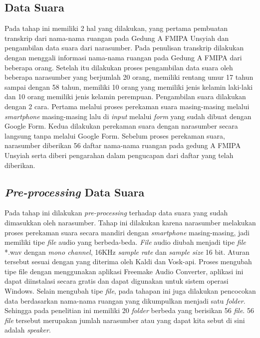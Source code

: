 \fancyhf{} 
\fancyfoot[R]{\thepage}

\subsection{Data Suara}
Pada tahap ini memiliki 2 hal yang dilakukan, yang pertama pembuatan transkrip dari nama-nama ruangan pada Gedung A FMIPA Unsyiah dan pengambilan data suara dari narasumber. Pada penulisan transkrip dilakukan dengan menggali informasi nama-nama ruangan pada Gedung A FMIPA dari beberapa orang. Setelah itu dilakukan proses pengambilan data suara oleh beberapa narasumber yang berjumlah 20 orang, memiliki rentang umur 17 tahun sampai dengan 58 tahun, memiliki 10 orang yang memiliki jenis kelamin laki-laki dan 10 orang memiliki jenis kelamin perempuan. Pengambilan suara dilakukan dengan 2 cara. Pertama melalui proses perekaman suara masing-masing melalui \textit{smartphone} masing-masing lalu di \textit{input} melalui \textit{form} yang sudah dibuat dengan Google Form. Kedua dilakukan perekaman suara dengan narasumber secara langsung tanpa melalui Google Form. Sebelum proses perekaman suara, narasumber diberikan 56 daftar nama-nama ruangan pada gedung A FMIPA Unsyiah serta diberi pengarahan dalam pengucapan dari daftar yang telah diberikan.

\subsection{\textit{Pre-processing} Data Suara}
Pada tahap ini dilakukan \textit{pre-processing} terhadap data suara yang sudah dimasukkan oleh narasumber. Tahap ini dilakukan karena narasumber melakukan proses perekaman suara secara mandiri dengan \textit{smartphone} masing-masing, jadi memiliki tipe \textit{file} audio yang berbeda-beda. \textit{File} audio diubah menjadi tipe \textit{file} *.wav dengan \textit{mono channel}, 16KHz \textit{sample rate} dan \textit{sample size} 16 bit. Aturan tersebut sesuai dengan yang diterima oleh Kaldi dan Vosk-api. Proses mengubah tipe file dengan menggunakan aplikasi Freemake Audio Converter, aplikasi ini dapat diinstalasi secara gratis dan dapat digunakan untuk sistem operasi Windows. 
Selain mengubah tipe \textit{file}, pada tahapan ini juga dilakukan pencocokan data berdasarkan nama-nama ruangan yang dikumpulkan menjadi satu \textit{folder}. Sehingga pada penelitian ini memiliki 20 \textit{folder} berbeda yang berisikan 56 \textit{file}. 56 \textit{file} tersebut merupakan jumlah narasumber atau yang dapat kita sebut di sini adalah \textit{speaker}.


